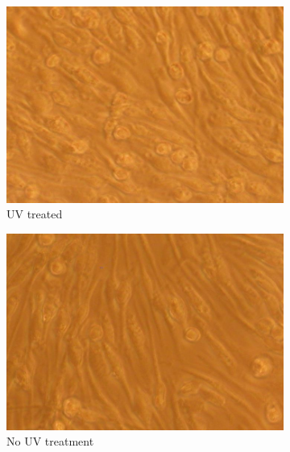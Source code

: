 \documentclass[fleqn,10pt]{wlpeerj}
\begin{document}
\begin{figure}
    \centering
    \begin{subfigure}[b]{0.24\textwidth}
        \centering
        \includegraphics[width=\textwidth]{mouse_UV}
        \caption{UV treated}
        \label{fig:mouse_uv}
    \end{subfigure}
    \hfill
    \begin{subfigure}[b]{0.24\textwidth}
        \centering
        \includegraphics[width=\textwidth]{mouse_noUV}
        \caption{No UV treatment}
        \label{fig:mouse_nouv}
    \end{subfigure}
    \hfill
    \begin{subfigure}[b]{0.24\textwidth}
        \centering

\end{subfigure}
\end{figure}
\end{document}
